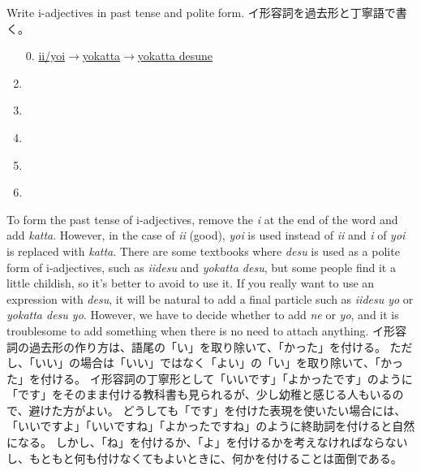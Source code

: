 \documentclass[uplatex,dvipdfmx,b5paper,english,10pt]{jsbook}
\begin{document}
\begin{toiquestion}
\ifEnglish
Write i-adjectives in past tense and polite form.
\else
イ形容詞を過去形と丁寧語で書く。
\fi
\end{toiquestion}

\begin{enumerate}
\item[0.]
  \underline{\hspace{1em}ii/yoi\hspace{1em}$\rightarrow$\hspace{2em}yokatta\hspace{1em}$\rightarrow$\hspace{2em}yokatta desune\hspace{2.7em}}
\item \underline{\hspace{24em}} \rule{0mm}{3.5mm}
\item \underline{\hspace{24em}}
\item \underline{\hspace{24em}}
\item \underline{\hspace{24em}}
\item \underline{\hspace{24em}}
\end{enumerate}

\begin{toianswer}
\ifEnglish
To form the past tense of i-adjectives, remove the {\it i\/} at the end of the word and add {\it katta\/}.
However, in the case of {\it ii\/} (good), {\it yoi\/} is used instead of {\it ii\/} and {\it i\/} of {\it yoi\/} is replaced with {\it katta\/}.
There are some textbooks where {\it desu\/} is used as a polite form of i-adjectives, such as {\it iidesu\/} and {\it yokatta desu\/}, but some people find it a little childish, so it's better to avoid to use it.
If you really want to use an expression with {\it desu\/}, it will be natural to add a final particle such as {\it iidesu yo\/} or {\it yokatta desu yo\/}.
However, we have to decide whether to add {\it ne\/} or {\it yo\/}, and it is troublesome to add something when there is no need to attach anything.
\else
イ形容詞の過去形の作り方は、語尾の「い」を取り除いて、「かった」を付ける。
ただし、「いい」の場合は「いい」ではなく「よい」の「い」を取り除いて、「かった」を付ける。
イ形容詞の丁寧形として「いいです」「よかったです」のように「です」をそのまま付ける教科書も見られるが、少し幼稚と感じる人もいるので、避けた方がよい。
どうしても「です」を付けた表現を使いたい場合には、「いいですよ」「いいですね」「よかったですね」のように終助詞を付けると自然になる。
しかし、「ね」を付けるか、「よ」を付けるかを考えなければならないし、もともと何も付けなくてもよいときに、何かを付けることは面倒である。
\fi
\end{toianswer}
\end{document}
